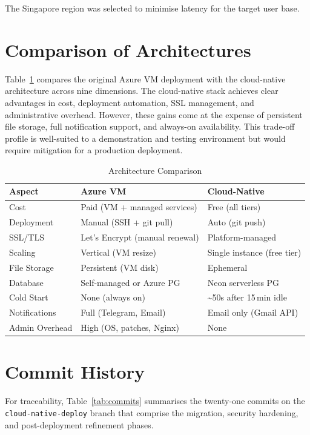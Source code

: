 \documentclass[conference]{IEEEtran}
\begin{document}
The Singapore region was selected to minimise latency for the target user base.

\section{Comparison of Architectures}

Table~\ref{tab:comparison} compares the original Azure VM deployment with the cloud-native architecture across nine dimensions. The cloud-native stack achieves clear advantages in cost, deployment automation, SSL management, and administrative overhead. However, these gains come at the expense of persistent file storage, full notification support, and always-on availability. This trade-off profile is well-suited to a demonstration and testing environment but would require mitigation for a production deployment.

\begin{table}[H]
\centering
\caption{Architecture Comparison}
\label{tab:comparison}
\begin{tabular}{@{}p{2cm}p{2.8cm}p{2.5cm}@{}}
\toprule
\textbf{Aspect} & \textbf{Azure VM} & \textbf{Cloud-Native} \\
\midrule
Cost & Paid (VM + managed services) & Free (all tiers) \\
Deployment & Manual (SSH + git pull) & Auto (git push) \\
SSL/TLS & Let's Encrypt (manual renewal) & Platform-managed \\
Scaling & Vertical (VM resize) & Single instance (free tier) \\
File Storage & Persistent (VM disk) & Ephemeral \\
Database & Self-managed or Azure PG & Neon serverless PG \\
Cold Start & None (always on) & \textasciitilde50s after 15\,min idle \\
Notifications & Full (Telegram, Email) & Email only (Gmail API) \\
Admin Overhead & High (OS, patches, Nginx) & None \\
\bottomrule
\end{tabular}
\end{table}

\section{Commit History}

For traceability, Table~\ref{tab:commits} summarises the twenty-one commits on the \texttt{cloud-native-deploy} branch that comprise the migration, security hardening, and post-deployment refinement phases.
\end{document}
